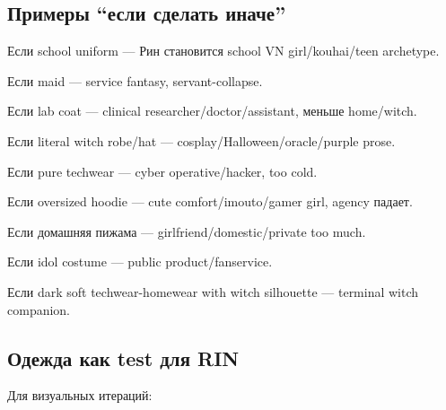 \subsection*{Примеры ``если сделать иначе''}

Если school uniform --- Рин становится school VN girl/\hspace{0pt}kouhai/\hspace{0pt}teen
archetype.

Если maid --- service fantasy, servant-collapse.

Если lab coat --- clinical researcher/\hspace{0pt}doctor/\hspace{0pt}assistant, меньше
home/\hspace{0pt}witch.

Если literal witch robe/\hspace{0pt}hat --- cosplay/\hspace{0pt}Halloween/\hspace{0pt}oracle/\hspace{0pt}purple prose.

Если pure techwear --- cyber operative/\hspace{0pt}hacker, too cold.

Если oversized hoodie --- cute comfort/\hspace{0pt}imouto/\hspace{0pt}gamer girl, agency падает.

Если домашняя пижама --- girlfriend/\hspace{0pt}domestic/\hspace{0pt}private too much.

Если idol costume --- public product/\hspace{0pt}fanservice.

Если dark soft techwear-homewear with witch silhouette --- terminal
witch companion.

\subsection*{Одежда как test для RIN}

Для визуальных итераций:

